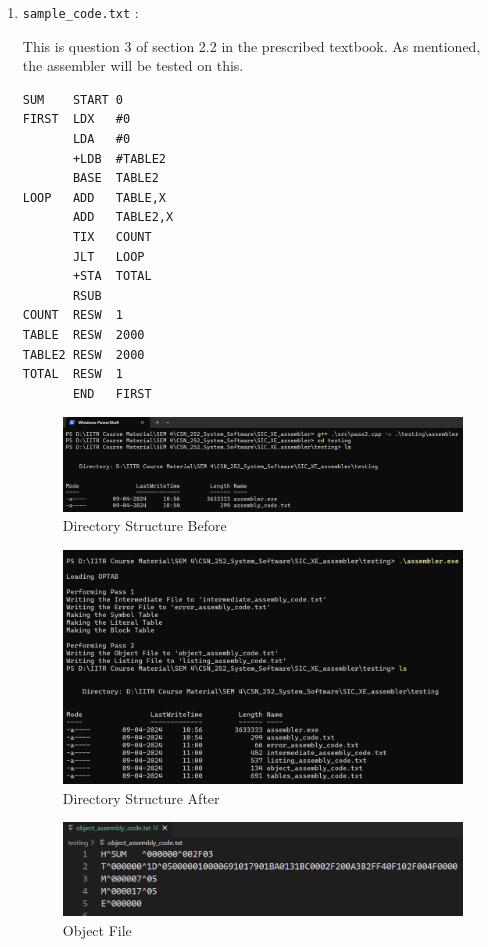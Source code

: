 \documentclass[
]{article}
\begin{document}
\begin{enumerate}
\def\labelenumi{\arabic{enumi})}
\item
  \texttt{sample\_code.txt} :

This is question 3 of section 2.2 in the prescribed textbook. As
mentioned, the assembler will be tested on this.

\begin{verbatim}
SUM    START 0
FIRST  LDX   #0
       LDA   #0
       +LDB  #TABLE2
       BASE  TABLE2
LOOP   ADD   TABLE,X
       ADD   TABLE2,X 
       TIX   COUNT
       JLT   LOOP
       +STA  TOTAL
       RSUB
COUNT  RESW  1
TABLE  RESW  2000
TABLE2 RESW  2000
TOTAL  RESW  1
       END   FIRST
\end{verbatim}

\begin{figure}[H]
\centering
\includegraphics{img/image.png}
\caption{Directory Structure Before}
\end{figure}

\begin{figure}[H]
\centering
\includegraphics{img/image-10.png}
\caption{Directory Structure After}
\end{figure}

\begin{figure}[H]
\centering
\includegraphics{img/image-4.png}
\caption{Object File}
\end{figure}


\end{enumerate}
\end{document}
